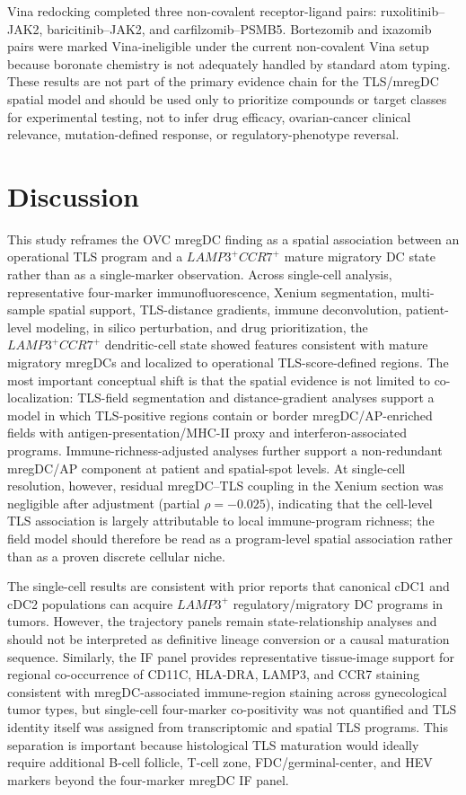 \documentclass[cancers,article,submit,pdftex,moreauthors]{Definitions/mdpi}
\begin{document}
Vina redocking completed three non-covalent receptor-ligand pairs: ruxolitinib--JAK2, baricitinib--JAK2, and carfilzomib--PSMB5. Bortezomib and ixazomib pairs were marked Vina-ineligible under the current non-covalent Vina setup because boronate chemistry is not adequately handled by standard atom typing. These results are not part of the primary evidence chain for the TLS/mregDC spatial model and should be used only to prioritize compounds or target classes for experimental testing, not to infer drug efficacy, ovarian-cancer clinical relevance, mutation-defined response, or regulatory-phenotype reversal.

\section{Discussion}
This study reframes the OVC mregDC finding as a spatial association between an operational TLS program and a $LAMP3^{+}CCR7^{+}$ mature migratory DC state rather than as a single-marker observation. Across single-cell analysis, representative four-marker immunofluorescence, Xenium segmentation, multi-sample spatial support, TLS-distance gradients, immune deconvolution, patient-level modeling, in silico perturbation, and drug prioritization, the $LAMP3^{+}CCR7^{+}$ dendritic-cell state showed features consistent with mature migratory mregDCs and localized to operational TLS-score-defined regions. The most important conceptual shift is that the spatial evidence is not limited to co-localization: TLS-field segmentation and distance-gradient analyses support a model in which TLS-positive regions contain or border mregDC/AP-enriched fields with antigen-presentation/MHC-II proxy and interferon-associated programs. Immune-richness-adjusted analyses further support a non-redundant mregDC/AP component at patient and spatial-spot levels. At single-cell resolution, however, residual mregDC--TLS coupling in the Xenium section was negligible after adjustment (partial $\rho=-0.025$), indicating that the cell-level TLS association is largely attributable to local immune-program richness; the field model should therefore be read as a program-level spatial association rather than as a proven discrete cellular niche.

The single-cell results are consistent with prior reports that canonical cDC1 and cDC2 populations can acquire $LAMP3^{+}$ regulatory/migratory DC programs in tumors\cite{bib17,bib18,bib20,bib21}. However, the trajectory panels remain state-relationship analyses and should not be interpreted as definitive lineage conversion or a causal maturation sequence. Similarly, the IF panel provides representative tissue-image support for regional co-occurrence of CD11C, HLA-DRA, LAMP3, and CCR7 staining consistent with mregDC-associated immune-region staining across gynecological tumor types, but single-cell four-marker co-positivity was not quantified and TLS identity itself was assigned from transcriptomic and spatial TLS programs. This separation is important because histological TLS maturation would ideally require additional B-cell follicle, T-cell zone, FDC/germinal-center, and HEV markers beyond the four-marker mregDC IF panel.
\end{document}
